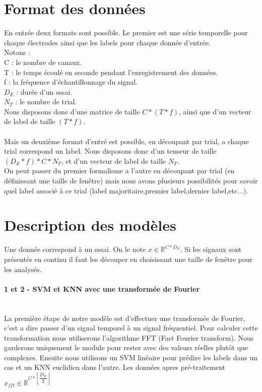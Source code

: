 \documentclass{article}[12pt]
\begin{document}
\section{Format des données}
En entrée deux formats sont possible. Le premier est une série temporelle pour chaque électrodes ainsi que les labels pour chaque donnée d'entrée.\\
Notons :\\
C : le nombre de canaux.\\
T : le temps écoulé en seconde pendant l'enregistrement des données.\\
f : la fréquence d’échantillonnage du signal.\\
$D_{E}$ : durée d'un essai.\\
$N_{T}$ : le nombre de trial.\\
Nous disposons donc d'une matrice de taille $C*(T*f)$, ainsi que d'un vecteur de label de taille $(T*f)$.\\
\\
Mais un deuxième format d'entré est possible, en découpant par trial, a chaque trial correspond un label. Nous disposons donc d'un tenseur de taille $(D_{E}*f)*C*N_{T}$, et d'un vecteur de label de taille $N_{T}$.\\
On peut passer du premier formalisme a l'autre en découpant par trial (en définissant une taille de fenêtre) mais nous avons plusieurs possibilités pour savoir quel label associé à ce trial (label majoritaire,premier label,dernier label,etc...).\\
\section{Description des modèles}
Une donnée correspond à un essai. On le note $x\in \mathbb{R}^{C*D_{E}}$. Si les signaux sont présentés en continu il faut les découper en choisissant une taille de fenêtre pour les analysés.
\paragraph{1 et 2 - SVM et KNN avec une transformée de Fourier}\mbox{}\\
La première étape de notre modèle est d'effectuer une transformée de Fourier, c'est a dire passer d'un signal temporel à un signal fréquentiel. Pour calculer cette transformation nous utiliserons l'algorithme FFT (Fast Fourier transform). Nous garderons uniquement le module pour rester avec des valeurs réelles plutôt que complexes. Ensuite nous utilisons un SVM linéaire pour prédire les labels dans un cas et un KNN euclidien dans l'autre. Les données apres pré-traitement $x_{fft}\in \mathbb{R}^{C*\left\lfloor\dfrac{D_{E}}{2}\right\rfloor}$
\end{document}
